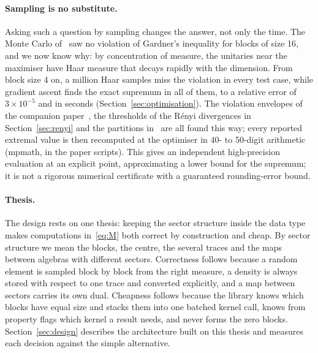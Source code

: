\documentclass[11pt]{article}
\begin{document}
\paragraph{Sampling is no substitute.} Asking such a question by sampling changes the answer, not only the time. The
Monte Carlo of~\cite{abed2024,v1} saw no violation of Gardner's inequality for blocks of size 16, and we now
know why: by concentration of measure, the unitaries near the maximiser have Haar measure that decays rapidly with the
dimension. From block size 4 on, a million Haar samples miss the violation in every test case, while gradient ascent
finds the exact supremum in all of them, to a relative error of $3\times10^{-5}$ and in seconds
(Section~\ref{sec:optimisation}). The violation envelopes of the companion paper~\cite{nn_trace}, the thresholds of
the Rényi divergences in Section~\ref{sec:renyi} and the partitions in~\cite{nn_cs} are all found this way; every
reported extremal value is then recomputed at the optimiser in 40- to 50-digit arithmetic (mpmath, in the paper
scripts). This gives an independent high-precision evaluation at an explicit point, approximating a lower bound
for the supremum; it is not a rigorous numerical certificate with a guaranteed rounding-error bound.

\paragraph{Thesis.} The design rests on one thesis: keeping the sector structure inside the data type makes
computations in~\eqref{eq:M} both correct by construction and cheap. By sector structure we mean the blocks, the centre,
the several traces and the maps between algebras with different sectors. Correctness follows because a random element
is sampled block by block from the right measure, a density is always stored with respect to one trace and converted
explicitly, and a map between sectors carries its own dual. Cheapness follows because the library knows which blocks
have equal size and stacks them into one batched kernel call, knows from property flags which kernel a result needs,
and never forms the zero blocks. Section~\ref{sec:design} describes the architecture built on this thesis and measures
each decision against the simple alternative.
\end{document}
